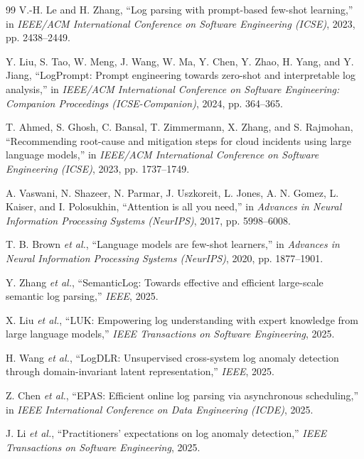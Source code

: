 \documentclass[conference]{IEEEtran}
\begin{document}
\begin{thebibliography}{99}
V.-H. Le and H. Zhang, ``Log parsing with prompt-based few-shot learning,'' in \textit{IEEE/ACM International Conference on Software Engineering (ICSE)}, 2023, pp. 2438--2449.

Y. Liu, S. Tao, W. Meng, J. Wang, W. Ma, Y. Chen, Y. Zhao, H. Yang, and Y. Jiang, ``LogPrompt: Prompt engineering towards zero-shot and interpretable log analysis,'' in \textit{IEEE/ACM International Conference on Software Engineering: Companion Proceedings (ICSE-Companion)}, 2024, pp. 364--365.

T. Ahmed, S. Ghosh, C. Bansal, T. Zimmermann, X. Zhang, and S. Rajmohan, ``Recommending root-cause and mitigation steps for cloud incidents using large language models,'' in \textit{IEEE/ACM International Conference on Software Engineering (ICSE)}, 2023, pp. 1737--1749.

A. Vaswani, N. Shazeer, N. Parmar, J. Uszkoreit, L. Jones, A. N. Gomez, L. Kaiser, and I. Polosukhin, ``Attention is all you need,'' in \textit{Advances in Neural Information Processing Systems (NeurIPS)}, 2017, pp. 5998--6008.

T. B. Brown \textit{et al.}, ``Language models are few-shot learners,'' in \textit{Advances in Neural Information Processing Systems (NeurIPS)}, 2020, pp. 1877--1901.

Y. Zhang \textit{et al.}, ``SemanticLog: Towards effective and efficient large-scale semantic log parsing,'' \textit{IEEE}, 2025.

X. Liu \textit{et al.}, ``LUK: Empowering log understanding with expert knowledge from large language models,'' \textit{IEEE Transactions on Software Engineering}, 2025.

H. Wang \textit{et al.}, ``LogDLR: Unsupervised cross-system log anomaly detection through domain-invariant latent representation,'' \textit{IEEE}, 2025.

Z. Chen \textit{et al.}, ``EPAS: Efficient online log parsing via asynchronous scheduling,'' in \textit{IEEE International Conference on Data Engineering (ICDE)}, 2025.

J. Li \textit{et al.}, ``Practitioners' expectations on log anomaly detection,'' \textit{IEEE Transactions on Software Engineering}, 2025.

\end{thebibliography}
\end{document}
